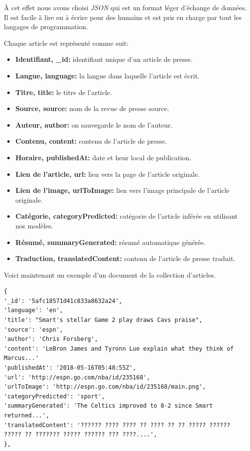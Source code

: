 À cet effet nous avons choisi \emph{JSON} qui est un format léger d'échange de données. Il est facile à lire ou à écrire pour des humains\cite{json} et est pris en charge par tout les langages de programmation.

Chaque article est représenté comme suit:
\begin{itemize}
    \item \textbf{Identifiant, \textquotedbl \_id\textquotedbl: } identifiant unique d'un article de presse.
    \item \textbf{Langue, \textquotedbl language\textquotedbl:} la langue dans laquelle l'article est écrit.
    \item \textbf{Titre, \textquotedbl title\textquotedbl:} le titre de l'article.
    \item \textbf{Source, \textquotedbl source\textquotedbl:} nom de la revue de presse source.
    \item \textbf{Auteur, \textquotedbl author\textquotedbl:} on sauvegarde le nom de l'auteur.
    \item \textbf{Contenu, \textquotedbl content\textquotedbl:} contenu de l'article de presse.
    \item \textbf{Horaire, \textquotedbl publishedAt\textquotedbl:} date et heur local de publication.
    \item \textbf{Lien de l'article, \textquotedbl url\textquotedbl:} lien vers la page de l'article originale.
    \item \textbf{Lien de l'image, \textquotedbl urlToImage\textquotedbl:} lien vers l'image principale de l'article originale.
    \item \textbf{Catégorie, \textquotedbl categoryPredicted\textquotedbl:} catégorie de l'article inférée en utilisant nos modèles.
    \item \textbf{Résumé, \textquotedbl summaryGenerated\textquotedbl:} résumé automatique générée.
    \item \textbf{Traduction, \textquotedbl translatedContent\textquotedbl:} contenu de l'article de presse traduit.\\
\end{itemize}

Voici maintenant un exemple d'un document de la collection d'articles.
\begin{lstlisting}[style=code]
{
'_id': '5afc18571d41c833a8632a24', 
'language': 'en',
'title': "Smart's stellar Game 2 play draws Cavs praise", 
'source': 'espn', 
'author': 'Chris Forsberg', 
'content': 'LeBron James and Tyronn Lue explain what they think of Marcus...'
'publishedAt': '2018-05-16T05:48:55Z', 
'url': 'http://espn.go.com/nba/id/235168',
'urlToImage': 'http://espn.go.com/nba/id/235168/main.png',  
'categoryPredicted': 'sport', 
'summaryGenerated': 'The Celtics improved to 8-2 since Smart returned...', 
'translatedContent': '?????? ???? ???? ?? ???? ?? ?? ????? ?????? ????? ?? ??????? ????? ?????? ??? ????....', 
},
\end{lstlisting}

